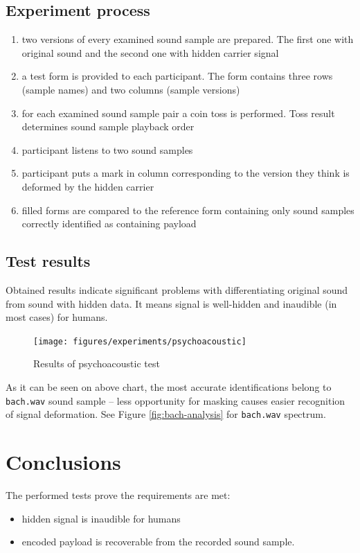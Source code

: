 \subsection{Experiment process}
\begin{enumerate}
  \item two versions of every examined sound sample are prepared. The first one with original sound and the second one with hidden carrier signal
  \item a test form is provided to each participant. The form contains three rows (sample names) and two columns (sample versions)
  \item for each examined sound sample pair a coin toss is performed. Toss result determines sound sample playback order
  \item participant listens to two sound samples
  \item participant puts a mark in column corresponding to the version they think is deformed by the hidden carrier
  \item filled forms are compared to the reference form containing only sound samples correctly identified as containing payload
\end{enumerate}

\subsection{Test results}
Obtained results indicate significant problems with differentiating original sound from sound with hidden data. It means signal
is well-hidden and inaudible (in most cases) for humans.

\begin{figure}[!hb]
  \centering
  \texttt{[image: figures/experiments/psychoacoustic]}
  \label{fig:psychoacoustic-results}
  \caption{Results of psychoacoustic test}
\end{figure}

As it can be seen on above chart, the most accurate identifications belong to \verb|bach.wav| sound sample -- less opportunity for masking causes easier recognition of signal deformation.
See Figure \ref{fig:bach-analysis} for \verb|bach.wav| spectrum.

\section{Conclusions}
The performed tests prove the requirements are met:
\begin{itemize}
  \item hidden signal is inaudible for humans
  \item encoded payload is recoverable from the recorded sound sample.
\end{itemize}

